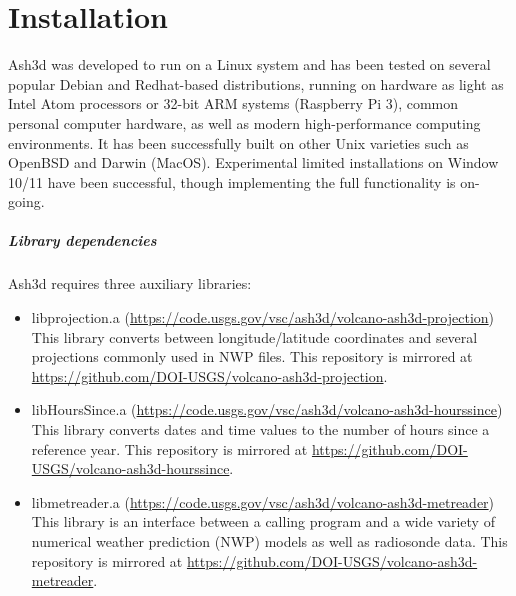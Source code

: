 \chapter{Installation}\label{ChapInstall}
Ash3d was developed to run on a Linux system and has been tested on several
popular Debian and Redhat-based distributions, running on hardware as light
as Intel Atom processors or 32-bit ARM systems (Raspberry Pi 3), common
personal computer hardware, as well as modern high-performance computing
environments.
It has been successfully built on other Unix varieties such as OpenBSD
and Darwin (MacOS).  Experimental limited installations on Window 10/11 have been
successful, though implementing the full functionality is on-going.

\paragraph{Library dependencies}
Ash3d requires three auxiliary libraries:
\begin{itemize}
\item libprojection.a (\url{https://code.usgs.gov/vsc/ash3d/volcano-ash3d-projection}) \\
This library converts between longitude/latitude coordinates and several projections
commonly used in NWP files.
This repository is mirrored at \url{https://github.com/DOI-USGS/volcano-ash3d-projection}.

\item libHoursSince.a (\url{https://code.usgs.gov/vsc/ash3d/volcano-ash3d-hourssince}) \\
This library converts dates and time values to the number of hours since a
reference year.
This repository is mirrored at \url{https://github.com/DOI-USGS/volcano-ash3d-hourssince}.

\item libmetreader.a  (\url{https://code.usgs.gov/vsc/ash3d/volcano-ash3d-metreader}) \\
This library is an interface between a calling program and a wide variety of
numerical weather prediction (NWP) models as well as radiosonde data.
This repository is mirrored at \url{https://github.com/DOI-USGS/volcano-ash3d-metreader}.

\end{itemize}

